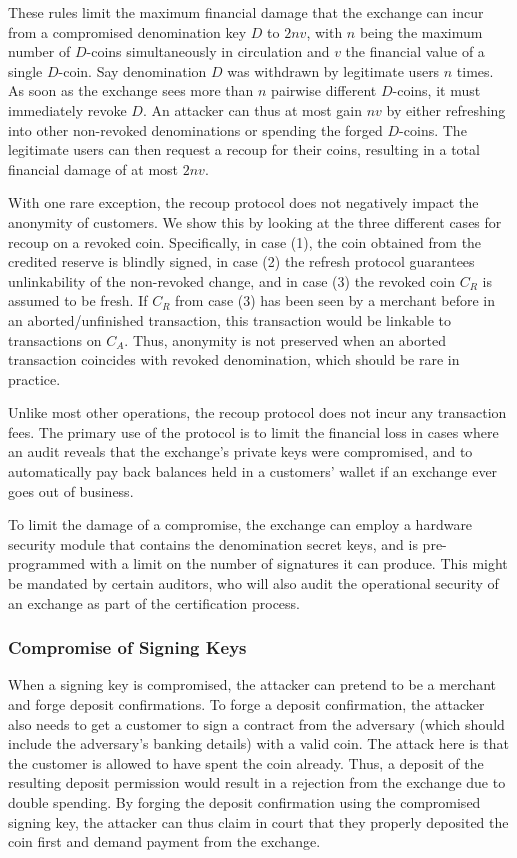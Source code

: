 These rules limit the maximum financial damage that the exchange can incur from
a compromised denomination key $D$ to $2nv$, with $n$ being the
maximum number of $D$-coins simultaneously in circulation and $v$ the financial
value of a single $D$-coin.  Say denomination $D$ was withdrawn by
legitimate users $n$ times.  As soon as the exchange sees more
than $n$ pairwise different $D$-coins, it must immediately
revoke $D$.  An attacker can thus at most gain $nv$ by either
refreshing into other non-revoked denominations or spending the forged $D$-coins.
The legitimate users can then request a recoup for their coins, resulting in
a total financial damage of at most $2nv$.

With one rare exception, the recoup protocol does not negatively impact the
anonymity of customers.  We show this by looking at the three different cases
for recoup on a revoked coin.  Specifically, in case (1), the coin obtained
from the credited reserve is blindly signed, in case (2) the refresh protocol
guarantees unlinkability of the non-revoked change, and in case (3) the revoked
coin $C_R$ is assumed to be fresh.  If $C_R$ from case (3) has been seen by a
merchant before in an aborted/unfinished transaction, this transaction would be
linkable to transactions on $C_A$.  Thus, anonymity is not preserved when an
aborted transaction coincides with revoked denomination, which should be rare
in practice.

Unlike most other operations, the
recoup protocol does not incur any transaction fees. The primary use of the
protocol is to limit the financial loss in cases where an audit reveals that
the exchange's private keys were compromised, and to automatically pay back
balances held in a customers' wallet if an exchange ever goes out of business.

To limit the damage of a compromise, the exchange can employ a hardware
security module that contains the denomination secret keys, and is
pre-programmed with a limit on the number of signatures it can produce.  This
might be mandated by certain auditors, who will also audit the operational
security of an exchange as part of the certification process.



\subsubsection{Compromise of Signing Keys} \label{sec:signkey:compromise}

When a signing key is compromised, the attacker can pretend to be a
merchant and forge deposit confirmations.  To forge a deposit
confirmation, the attacker also needs to get a customer to sign a
contract from the adversary (which should include the adversary's
banking details) with a valid coin.  The attack here is that the
customer is allowed to have spent the coin already. Thus, a deposit of
the resulting deposit permission would result in a rejection from the
exchange due to double spending.  By forging the deposit confirmation
using the compromised signing key, the attacker can thus claim in
court that they properly deposited the coin first and demand payment
from the exchange.

